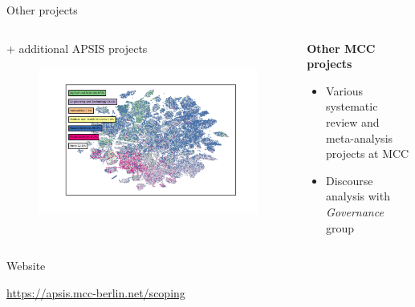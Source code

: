 \documentclass[9pt]{beamer}
\begin{document}
\begin{frame}[t]{Other projects}
\begin{columns}[t]
\begin{column}{0.33\linewidth}
		+ additional APSIS projects
		\citep{Lamb2017,Minx2017}
		\begin{figure}
			\includegraphics[width=\linewidth]{images/run_665_s_100000_p50_oecds.png}
		\end{figure}
	\end{column}
	\begin{column}{0.33\linewidth}
	\centering \textbf{ Other MCC projects }
	\begin{itemize}
		\item Various systematic review and meta-analysis projects at MCC
		\item Discourse analysis with \textit{Governance} group
	\end{itemize}
	\end{column}	
\end{columns}

\end{frame}






\begin{frame}{Website}

\url{https://apsis.mcc-berlin.net/scoping}

\end{frame}




\end{document}
